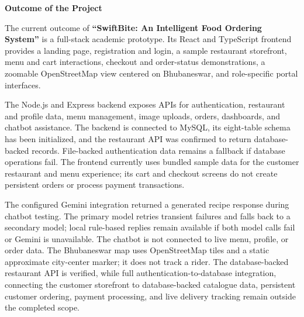 \begin{center}

\vspace*{0.3in}

\Large{\textbf{Outcome of the Project}}

\vspace{5mm}

\end{center}

The current outcome of \textbf{``SwiftBite: An Intelligent Food Ordering System''} is a full-stack academic prototype. Its React and TypeScript frontend provides a landing page, registration and login, a sample restaurant storefront, menu and cart interactions, checkout and order-status demonstrations, a zoomable OpenStreetMap view centered on Bhubaneswar, and role-specific portal interfaces.

The Node.js and Express backend exposes APIs for authentication, restaurant and profile data, menu management, image uploads, orders, dashboards, and chatbot assistance. The backend is connected to MySQL, its eight-table schema has been initialized, and the restaurant API was confirmed to return database-backed records. File-backed authentication data remains a fallback if database operations fail. The frontend currently uses bundled sample data for the customer restaurant and menu experience; its cart and checkout screens do not create persistent orders or process payment transactions.

The configured Gemini integration returned a generated recipe response during chatbot testing. The primary model retries transient failures and falls back to a secondary model; local rule-based replies remain available if both model calls fail or Gemini is unavailable. The chatbot is not connected to live menu, profile, or order data. The Bhubaneswar map uses OpenStreetMap tiles and a static approximate city-center marker; it does not track a rider. The database-backed restaurant API is verified, while full authentication-to-database integration, connecting the customer storefront to database-backed catalogue data, persistent customer ordering, payment processing, and live delivery tracking remain outside the completed scope.

\clearpage
